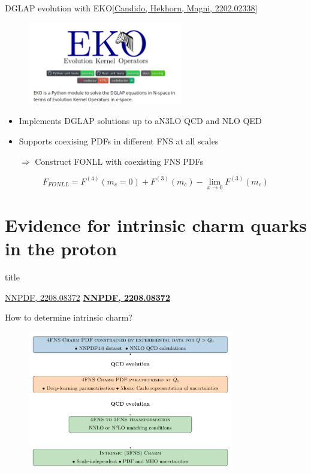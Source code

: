 \documentclass[aspectratio=43, 8pt,t]{beamer}
\newcommand{\SectionTitleFrame}[1][]{%
  \begin{frame}
    \vfill
    \centering
    \begin{beamercolorbox}[sep=8pt,center,shadow=true,rounded=true]{title}
      \usebeamerfont{title}\insertsection\par
    \end{beamercolorbox}
    \ifx\relax#1\relax\else
      \vspace{0.5cm}
      \textbf{#1}
    \fi
    \vfill
  \end{frame}
}
\begin{document}
\begin{frame}{DGLAP evolution with EKO}{\color{gray}\footnotesize [\hyperlink{https://arxiv.org/abs/2202.02338}{Candido, Hekhorn, Magni, 2202.02338}]}
  \begin{figure}
    \includegraphics[width=0.6\textwidth]{eko_header.png}
  \end{figure}
  \begin{itemize}
    \item Implements DGLAP solutions up to aN3LO QCD and NLO QED
    \item Supports coexising PDFs in different FNS at all scales
    \item[$\Rightarrow$] Construct FONLL with coexisting FNS PDFs
  \end{itemize}

  $$F_{FONLL} = F^{(4)}(m_c=0) + F^{(3)}(m_c) - \lim_{x\rightarrow 0} F^{(3)}(m_c)$$
\end{frame}


\section*{Evidence for intrinsic charm quarks in the proton}
\SectionTitleFrame[\hyperlink{https://arxiv.org/abs/2208.08372}{NNPDF, 2208.08372}]

\begin{frame}{How to determine intrinsic charm?}
  \begin{figure}
    \includegraphics[width=0.8\textwidth]{strategy.pdf}
  \end{figure}

\end{frame}
\end{document}
